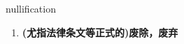 
\begin{frame}
{\huge nullification}
\begin{center}
\begin{enumerate}\Large
  \item \textbf{(尤指法律条文等正式的)废除，废弃}
\end{enumerate}
\end{center}
\end{frame}
